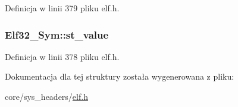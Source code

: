 Definicja w linii 379 pliku elf.\-h.

\hypertarget{struct_elf32___sym_abf8ff76884bc5e2acb5f7eb42f733c2e}{
\subsubsection[{st\-\_\-value}]{ Elf32\-\_\-\-Sym\-::st\-\_\-value}}\label{struct_elf32___sym_abf8ff76884bc5e2acb5f7eb42f733c2e}


Definicja w linii 378 pliku elf.\-h.



Dokumentacja dla tej struktury została wygenerowana z pliku\-:\begin{DoxyCompactItemize}
\item 
core/sys\-\_\-headers/\hyperlink{elf_8h}{elf.\-h}\end{DoxyCompactItemize}
